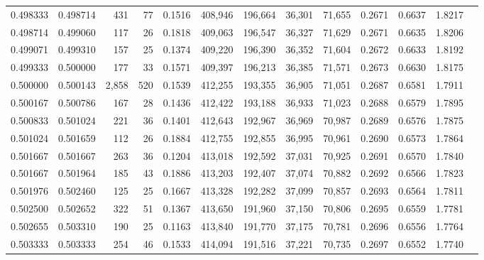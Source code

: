 \begin{tabular}{rrrrrrrrrrrrr}
0.498333 & 0.498714 &   431 &  77 &                                     0.1516 & 408,946 & 196,664 &  36,301 &  71,655 & 0.2671 & 0.6637 & 1.8217 \\
0.498714 & 0.499060 &   117 &  26 &                                     0.1818 & 409,063 & 196,547 &  36,327 &  71,629 & 0.2671 & 0.6635 & 1.8206 \\
0.499071 & 0.499310 &   157 &  25 &                                     0.1374 & 409,220 & 196,390 &  36,352 &  71,604 & 0.2672 & 0.6633 & 1.8192 \\
0.499333 & 0.500000 &   177 &  33 &                                     0.1571 & 409,397 & 196,213 &  36,385 &  71,571 & 0.2673 & 0.6630 & 1.8175 \\
0.500000 & 0.500143 & 2,858 & 520 &                                     0.1539 & 412,255 & 193,355 &  36,905 &  71,051 & 0.2687 & 0.6581 & 1.7911 \\
0.500167 & 0.500786 &   167 &  28 &                                     0.1436 & 412,422 & 193,188 &  36,933 &  71,023 & 0.2688 & 0.6579 & 1.7895 \\
0.500833 & 0.501024 &   221 &  36 &                                     0.1401 & 412,643 & 192,967 &  36,969 &  70,987 & 0.2689 & 0.6576 & 1.7875 \\
0.501024 & 0.501659 &   112 &  26 &                                     0.1884 & 412,755 & 192,855 &  36,995 &  70,961 & 0.2690 & 0.6573 & 1.7864 \\
0.501667 & 0.501667 &   263 &  36 &                                     0.1204 & 413,018 & 192,592 &  37,031 &  70,925 & 0.2691 & 0.6570 & 1.7840 \\
0.501667 & 0.501964 &   185 &  43 &                                     0.1886 & 413,203 & 192,407 &  37,074 &  70,882 & 0.2692 & 0.6566 & 1.7823 \\
0.501976 & 0.502460 &   125 &  25 &                                     0.1667 & 413,328 & 192,282 &  37,099 &  70,857 & 0.2693 & 0.6564 & 1.7811 \\
0.502500 & 0.502652 &   322 &  51 &                                     0.1367 & 413,650 & 191,960 &  37,150 &  70,806 & 0.2695 & 0.6559 & 1.7781 \\
0.502655 & 0.503310 &   190 &  25 &                                     0.1163 & 413,840 & 191,770 &  37,175 &  70,781 & 0.2696 & 0.6556 & 1.7764 \\
0.503333 & 0.503333 &   254 &  46 &                                     0.1533 & 414,094 & 191,516 &  37,221 &  70,735 & 0.2697 & 0.6552 & 1.7740 \\

\end{tabular}
